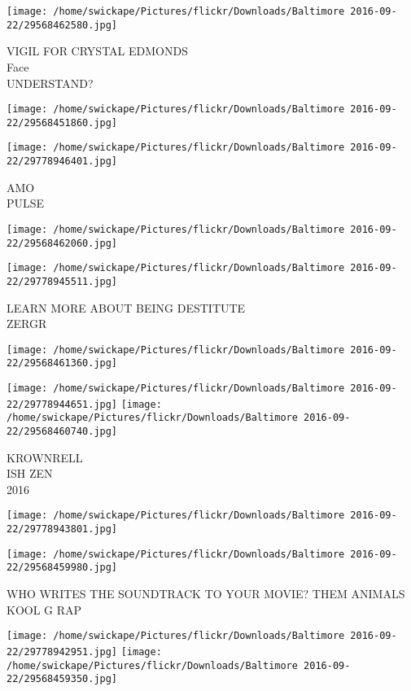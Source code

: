 \documentclass[10pt,letterpaper]{article}
\begin{document}
\vspace{0.25in}
\texttt{[image: /home/swickape/Pictures/flickr/Downloads/Baltimore 2016-09-22/29568462580.jpg]}

VIGIL FOR CRYSTAL EDMONDS\\
Face\\
UNDERSTAND?
\pagebreak

\texttt{[image: /home/swickape/Pictures/flickr/Downloads/Baltimore 2016-09-22/29568451860.jpg]}

\vspace{0.25in}
\texttt{[image: /home/swickape/Pictures/flickr/Downloads/Baltimore 2016-09-22/29778946401.jpg]}

AMO\\
PULSE
\pagebreak

\texttt{[image: /home/swickape/Pictures/flickr/Downloads/Baltimore 2016-09-22/29568462060.jpg]}

\vspace{0.25in}
\texttt{[image: /home/swickape/Pictures/flickr/Downloads/Baltimore 2016-09-22/29778945511.jpg]}

LEARN MORE ABOUT BEING DESTITUTE\\
ZERGR
\pagebreak

\texttt{[image: /home/swickape/Pictures/flickr/Downloads/Baltimore 2016-09-22/29568461360.jpg]}

\vspace{0.25in}
\texttt{[image: /home/swickape/Pictures/flickr/Downloads/Baltimore 2016-09-22/29778944651.jpg]}
\texttt{[image: /home/swickape/Pictures/flickr/Downloads/Baltimore 2016-09-22/29568460740.jpg]}

KROWNRELL\\
ISH ZEN\\
2016
\pagebreak

\texttt{[image: /home/swickape/Pictures/flickr/Downloads/Baltimore 2016-09-22/29778943801.jpg]}

\vspace{0.25in}
\texttt{[image: /home/swickape/Pictures/flickr/Downloads/Baltimore 2016-09-22/29568459980.jpg]}

WHO WRITES THE SOUNDTRACK TO YOUR MOVIE?  THEM ANIMALS\\
KOOL G RAP
\pagebreak

\texttt{[image: /home/swickape/Pictures/flickr/Downloads/Baltimore 2016-09-22/29778942951.jpg]}
\texttt{[image: /home/swickape/Pictures/flickr/Downloads/Baltimore 2016-09-22/29568459350.jpg]}
\end{document}
